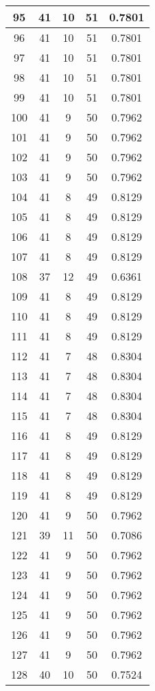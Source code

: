 \documentclass[letterpaper, 12pt]{article}
\begin{document}
\begin{longtable}{|c|c|c|c|c|}
\hline
95 & 41 & 10 & 51 & 0.7801 \\
\hline
96 & 41 & 10 & 51 & 0.7801 \\
\hline
97 & 41 & 10 & 51 & 0.7801 \\
\hline
98 & 41 & 10 & 51 & 0.7801 \\
\hline
99 & 41 & 10 & 51 & 0.7801 \\
\hline
100 & 41 & 9 & 50 & 0.7962 \\
\hline
101 & 41 & 9 & 50 & 0.7962 \\
\hline
102 & 41 & 9 & 50 & 0.7962 \\
\hline
103 & 41 & 9 & 50 & 0.7962 \\
\hline
104 & 41 & 8 & 49 & 0.8129 \\
\hline
105 & 41 & 8 & 49 & 0.8129 \\
\hline
106 & 41 & 8 & 49 & 0.8129 \\
\hline
107 & 41 & 8 & 49 & 0.8129 \\
\hline
108 & 37 & 12 & 49 & 0.6361 \\
\hline
109 & 41 & 8 & 49 & 0.8129 \\
\hline
110 & 41 & 8 & 49 & 0.8129 \\
\hline
111 & 41 & 8 & 49 & 0.8129 \\
\hline
112 & 41 & 7 & 48 & 0.8304 \\
\hline
113 & 41 & 7 & 48 & 0.8304 \\
\hline
114 & 41 & 7 & 48 & 0.8304 \\
\hline
115 & 41 & 7 & 48 & 0.8304 \\
\hline
116 & 41 & 8 & 49 & 0.8129 \\
\hline
117 & 41 & 8 & 49 & 0.8129 \\
\hline
118 & 41 & 8 & 49 & 0.8129 \\
\hline
119 & 41 & 8 & 49 & 0.8129 \\
\hline
120 & 41 & 9 & 50 & 0.7962 \\
\hline
121 & 39 & 11 & 50 & 0.7086 \\
\hline
122 & 41 & 9 & 50 & 0.7962 \\
\hline
123 & 41 & 9 & 50 & 0.7962 \\
\hline
124 & 41 & 9 & 50 & 0.7962 \\
\hline
125 & 41 & 9 & 50 & 0.7962 \\
\hline
126 & 41 & 9 & 50 & 0.7962 \\
\hline
127 & 41 & 9 & 50 & 0.7962 \\
\hline
128 & 40 & 10 & 50 & 0.7524 \\

\end{longtable}
\end{document}
